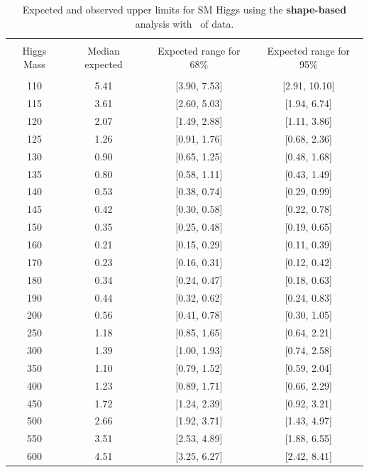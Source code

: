 \begin{table}[hbp!]
\begin{center}
\begin{tabular}{c c c c}
\hline
\vspace{-3mm} && \\
 Higgs Mass   & Median expected & Expected range for 68\% & Expected range for 95\%   \\
\vspace{-3mm} && \\
\hline
110 &  5.41 & [3.90, 7.53] & [2.91, 10.10] \\
115 &  3.61 & [2.60, 5.03] & [1.94, 6.74] \\
120 &  2.07 & [1.49, 2.88] & [1.11, 3.86] \\
125 &  1.26 & [0.91, 1.76] & [0.68, 2.36] \\
130 &  0.90 & [0.65, 1.25] & [0.48, 1.68] \\
135 &  0.80 & [0.58, 1.11] & [0.43, 1.49] \\
140 &  0.53 & [0.38, 0.74] & [0.29, 0.99] \\
145 &  0.42 & [0.30, 0.58] & [0.22, 0.78] \\
150 &  0.35 & [0.25, 0.48] & [0.19, 0.65] \\
160 &  0.21 & [0.15, 0.29] & [0.11, 0.39] \\
170 &  0.23 & [0.16, 0.31] & [0.12, 0.42] \\
180 &  0.34 & [0.24, 0.47] & [0.18, 0.63] \\
190 &  0.44 & [0.32, 0.62] & [0.24, 0.83] \\
200 &  0.56 & [0.41, 0.78] & [0.30, 1.05] \\
250 &  1.18 & [0.85, 1.65] & [0.64, 2.21] \\
300 &  1.39 & [1.00, 1.93] & [0.74, 2.58] \\
350 &  1.10 & [0.79, 1.52] & [0.59, 2.04] \\
400 &  1.23 & [0.89, 1.71] & [0.66, 2.29] \\
450 &  1.72 & [1.24, 2.39] & [0.92, 3.21] \\
500 &  2.66 & [1.92, 3.71] & [1.43, 4.97] \\
550 &  3.51 & [2.53, 4.89] & [1.88, 6.55] \\
600 &  4.51 & [3.25, 6.27] & [2.42, 8.41] \\
\hline
\end{tabular}
\caption{Expected and observed upper limits for SM Higgs using the
  {\bf shape-based} analysis with \intlumiEightTeV\ of data.}
\label{tab:mvabase_uls}
\end{center}
\end{table}
